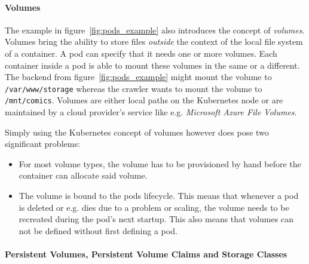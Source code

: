 \paragraph{Volumes}%
\label{par:Volumes}

The example in figure~\ref{fig:pods_example} also introduces the concept of
\textit{volumes}. Volumes bring the ability to store files \textit{outside} the
context of the local file system of a container. A pod can specify that it
needs one or more volumes. Each container inside a pod is able to mount these
volumes in the same or a different. The backend from
figure~\ref{fig:pods_example} might mount the volume to
\texttt{/var/www/storage} whereas the crawler wants to mount the volume to
\texttt{/mnt/comics}. Volumes are either local paths on the Kubernetes node or
are maintained by a cloud provider's service like e.g. \textit{Microsoft Azure
File Volumes}.

Simply using the Kubernetes concept of volumes however does pose two significant problems:
\begin{itemize}
  \item For most volume types, the volume has to be provisioned by hand before
    the container can allocate said volume.
  \item The volume is bound to the pods lifecycle. This means that whenever a
    pod is deleted or e.g. dies due to a problem or scaling, the volume needs
    to be recreated during the pod's next startup. This also means that volumes
    can not be defined without first defining a pod.
\end{itemize}

\paragraph{Persistent Volumes, Persistent Volume Claims and Storage Classes}%
\label{par:Persistent_Volume_Claims_and_Storage_Classes}

